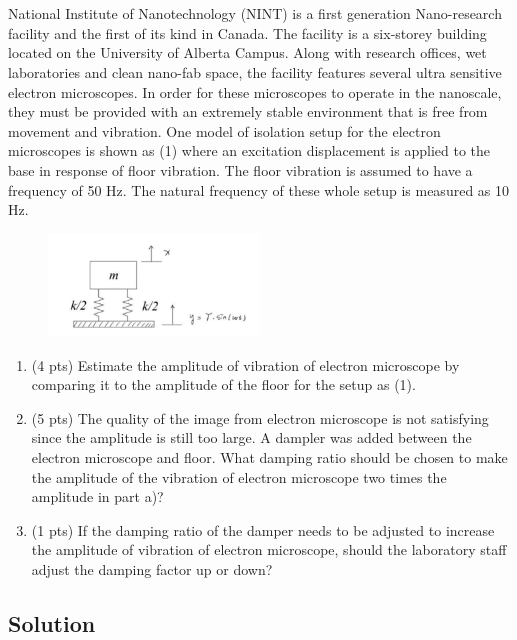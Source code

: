 \section{}
National Institute of Nanotechnology (NINT) is a first generation Nano-research facility and the first of its kind in Canada. The facility is a six-storey building located on the University of Alberta Campus. Along with research offices, wet laboratories and clean nano-fab space, the facility features several ultra sensitive electron microscopes. In order for these microscopes to operate in the nanoscale, they must be provided with an extremely stable environment that is free from movement and vibration. One model of isolation setup for the electron microscopes is shown as (1) where an excitation displacement is applied to the base in response of floor vibration. The floor vibration is assumed to have a frequency of 50 Hz. The natural frequency of these whole setup is measured as 10 Hz.

\begin{figure}[h]
    \centering
    \includegraphics[width=0.5\textwidth]{Questions/Figures/q3 problem diagram.png}
\end{figure}

\begin{enumerate}[label=(\alph*)]
    \item (4 pts) Estimate the amplitude of vibration of electron microscope by comparing it to the amplitude of the floor for the setup as (1).
    \item (5 pts) The quality of the image from electron microscope is not satisfying since the amplitude is still too large. A dampler was added between the electron microscope and floor. What damping ratio should be chosen to make the amplitude of the vibration of electron microscope two times the amplitude in part a)?
    \item (1 pts) If the damping ratio of the damper needs to be adjusted to increase the amplitude of vibration of electron microscope, should the laboratory staff adjust the damping factor up or down?
\end{enumerate}

\subsection*{Solution}
